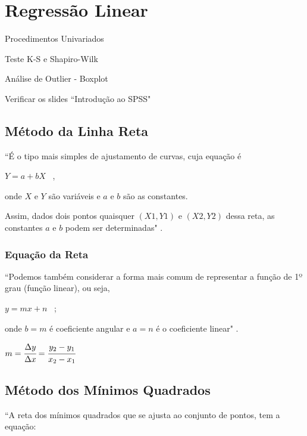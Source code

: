 \section{Regressão Linear}

Procedimentos Univariados

Teste K-S e Shapiro-Wilk

Análise de Outlier - Boxplot

Verificar os slides ``Introdução ao SPSS"

	\subsection{Método da Linha Reta}
	
		``É o tipo mais simples de ajustamento de curvas, cuja equação é
		
		\bigskip		
		
		{\Large $ Y = a + bX $} \ ,
		
		\bigskip
		
		onde  $ X $ e $ Y $ são variáveis e $ a $ e $ b $ são as constantes.

		Assim, dados dois pontos quaisquer $ (X1,Y1) $ e $ (X2,Y2) $ dessa reta, as constantes $ a $ e $ b $ podem ser determinadas" \cite{torres} .
	
		\subsubsection{Equação da Reta}
		
			``Podemos também considerar a forma mais comum de representar a função de 1º grau (função linear), ou seja, 
			
			\bigskip
			
			{\Large $ y = mx + n $} \ ;
			
			\bigskip
			
			onde $ b = m $ é coeficiente angular e $a = n$ é o coeficiente linear" . \cite{morettin}
			
			\bigskip			
			
			{\Large $ m = \cfrac{\Delta y}{\Delta x} = \cfrac{y_2 - y_1}{x_2 - x_1}$}
			
	\subsection{Método dos Mínimos Quadrados}

		``A reta dos mínimos quadrados que se ajusta ao conjunto de pontos, tem a equação:

